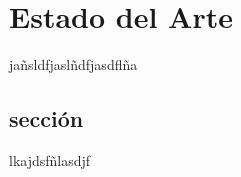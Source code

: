 
\chapter{Estado del Arte}
\label{chap:estado_del_arte}

jañsldfjaslñdfjasdflña

\section{sección}
\label{sec:seccion}

lkajdsfñlasdjf